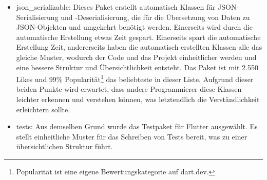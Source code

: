 \begin{itemize}
	
	\item json\_serializable\cite{tech_packageJson}: %
		Dieses Paket erstellt automatisch Klassen für JSON-Serialisierung und -Deserialisierung, die für die Übersetzung von Daten zu JSON-Objekten und umgekehrt benötigt werden. %
		Einerseits wird durch die automatische Erstellung etwas Zeit gespart. %
		Einerseits spart die automatische Erstellung Zeit, andererseits haben die automatisch erstellten Klassen alle das gleiche Muster, wodurch der Code und das Projekt einheitlicher werden und eine bessere Struktur und Übersichtlichkeit entsteht. %
		Das Paket ist mit 2.550 Likes und 99\% Popularität\footnote{Popularität ist eine eigene Bewertungskategorie auf dart.dev.} das beliebteste in dieser Liste. %
		Aufgrund dieser beiden Punkte wird erwartet, dass andere Programmierer diese Klassen leichter erkennen und verstehen können, was letztendlich die Verständlichkeit erleichtern sollte.%
		 

	\item tests\cite{tech_packageTest}: %
		Aus demselben Grund wurde das Testpaket für Flutter ausgewählt. Es stellt einheitliche Muster für das Schreiben von Tests bereit, was zu einer übersichtlichen Struktur führt. %
		

\end{itemize}
